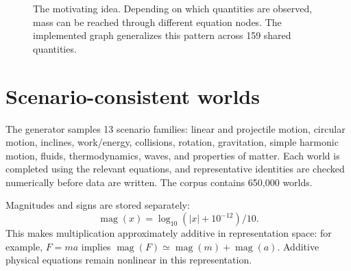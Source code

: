 \documentclass[10pt]{article}
\begin{document}
\begin{figure}[H]
\centering
{}
\caption{The motivating idea. Depending on which quantities are observed, mass can be reached through different equation nodes. The implemented graph generalizes this pattern across 159 shared quantities.}
\label{fig:massroutes}
\end{figure}

\section{Scenario-consistent worlds}

The generator samples 13 scenario families: linear and projectile motion, circular motion, inclines, work/energy, collisions, rotation, gravitation, simple harmonic motion, fluids, thermodynamics, waves, and properties of matter. Each world is completed using the relevant equations, and representative identities are checked numerically before data are written. The corpus contains 650,000 worlds.

Magnitudes and signs are stored separately:
\begin{equation}
 \operatorname{mag}(x)=\log_{10}(|x|+10^{-12})/10 .
\end{equation}
This makes multiplication approximately additive in representation space: for example, $F=ma$ implies $\operatorname{mag}(F)\simeq\operatorname{mag}(m)+\operatorname{mag}(a)$. Additive physical equations remain nonlinear in this representation.
\end{document}
